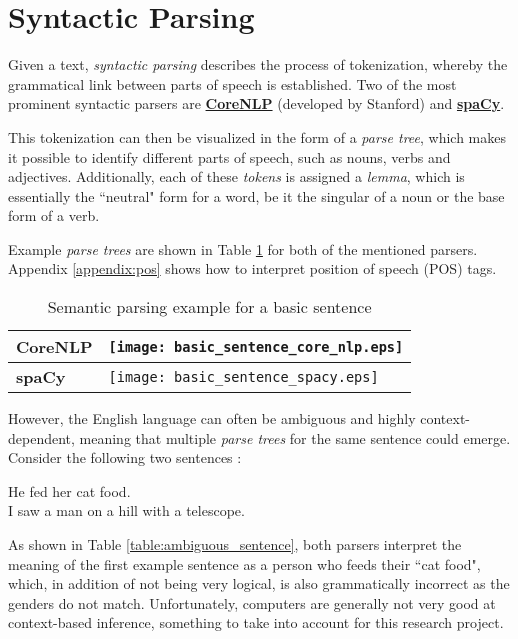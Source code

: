 \section{Syntactic Parsing}

Given a text, \textit{syntactic parsing} \cite{noauthor_syntactic_nodate} describes the process of tokenization, whereby the grammatical link between parts of speech is established. Two of the most prominent syntactic parsers are \textbf{\href{https://corenlp.run}{CoreNLP}} (developed by Stanford) and \textbf{\href{https://spacy.io}{spaCy}}.

This tokenization can then be visualized in the form of a \textit{parse tree}, which makes it possible to identify different parts of speech, such as nouns, verbs and adjectives. Additionally, each of these \textit{tokens} is assigned a \textit{lemma}, which is essentially the ``neutral" form for a word, be it the singular of a noun or the base form of a verb.

Example \textit{parse trees} are shown in Table \ref{table:basic_sentence} for both of the mentioned parsers. Appendix \ref{appendix:pos} shows how to interpret position of speech (POS) tags.

\begin{table}[H]
\centering
\begin{tabular}{@{}ll@{}}
\toprule
\textbf{CoreNLP} & \texttt{[image: basic\_sentence\_core\_nlp.eps]} \\ \midrule
\textbf{spaCy} & \texttt{[image: basic\_sentence\_spacy.eps]}  \\ \bottomrule
\end{tabular}
\caption{Semantic parsing example for a basic sentence}
\label{table:basic_sentence}
\end{table}

However, the English language can often be ambiguous and highly context-dependent, meaning that multiple \textit{parse trees} for the same sentence could emerge. Consider the following two sentences \cite{noauthor_studying_nodate}:
\begin{displayquote}
He fed her cat food. \\
I saw a man on a hill with a telescope.
\end{displayquote}
As shown in Table \ref{table:ambiguous_sentence}, both parsers interpret the meaning of the first example sentence as a person who feeds their ``cat food", which, in addition of not being very logical, is also grammatically incorrect as the genders do not match. Unfortunately, computers are generally not very good at context-based inference, something to take into account for this research project.

